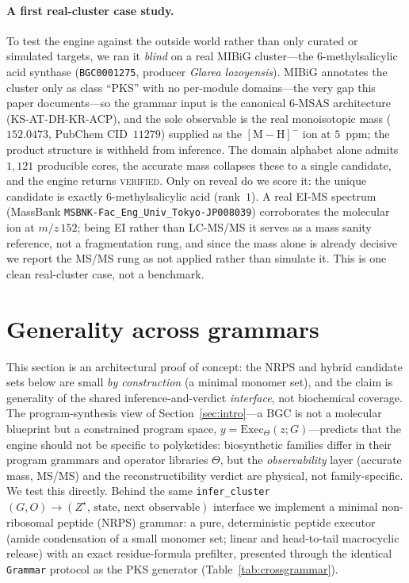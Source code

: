 \documentclass[11pt]{article}
\theoremstyle{definition}
\newcommand{\code}[1]{\texttt{#1}}
\begin{document}
\paragraph{A first real-cluster case study.} To test the engine against the outside world rather
than only curated or simulated targets, we ran it \emph{blind} on a real MIBiG cluster---the
6-methylsalicylic acid synthase (\texttt{BGC0001275}, producer \emph{Glarea lozoyensis}). MIBiG
annotates the cluster only as class ``PKS'' with no per-module domains---the very gap this paper
documents---so the grammar input is the canonical 6-MSAS architecture (KS-AT-DH-KR-ACP), and the
sole observable is the real monoisotopic mass ($152.0473$, PubChem CID~$11279$) supplied as the
$[\mathrm{M}-\mathrm{H}]^-$ ion at $5$~ppm; the product structure is withheld from inference. The
domain alphabet alone admits $1{,}121$ producible cores, the accurate mass collapses these to a
single candidate, and the engine returns \textsc{verified}. Only on reveal do we score it: the
unique candidate is exactly 6-methylsalicylic acid (rank~$1$). A real EI-MS spectrum (MassBank
\texttt{MSBNK-Fac\_Eng\_Univ\_Tokyo-JP008039}) corroborates the molecular ion at $m/z\,152$; being
EI rather than LC-MS/MS it serves as a mass sanity reference, not a fragmentation rung, and since
the mass alone is already decisive we report the MS/MS rung as not applied rather than simulate it.
This is one clean real-cluster case, not a benchmark.

\section{Generality across grammars}
\label{sec:crossgrammar}

This section is an architectural proof of concept: the NRPS and hybrid candidate sets below are
small \emph{by construction} (a minimal monomer set), and the claim is generality of the shared
inference-and-verdict \emph{interface}, not biochemical coverage. The program-synthesis view of
Section~\ref{sec:intro}---a BGC is not a molecular blueprint but a
constrained program space, $y=\mathrm{Exec}_{\Theta}(z;G)$---predicts that the engine should not be
specific to polyketides: biosynthetic families differ in their program grammars and operator
libraries $\Theta$, but the \emph{observability} layer (accurate mass, MS/MS) and the
reconstructibility verdict are physical, not family-specific. We test this directly. Behind the same
\code{infer\_cluster}$(G,O)\!\to\!(Z^{\star},\,\text{state},\,\text{next observable})$ interface we
implement a minimal non-ribosomal peptide (NRPS) grammar: a pure, deterministic peptide executor
(amide condensation of a small monomer set; linear and head-to-tail macrocyclic release) with an
exact residue-formula prefilter, presented through the identical \code{Grammar} protocol as the PKS
generator (Table~\ref{tab:crossgrammar}).
\end{document}
